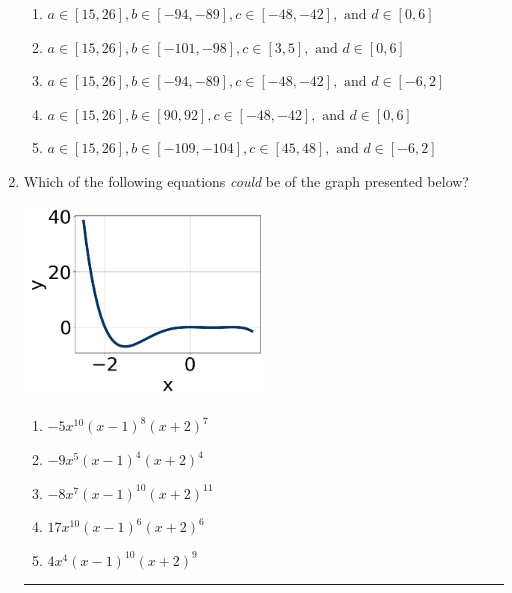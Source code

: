 \documentclass[14pt]{extbook}
\newcommand{\litem}[1]{\item#1\hspace*{-1cm}\rule{\textwidth}{0.4pt}}
\begin{document}
\begin{enumerate}
{\begin{enumerate}[label=\Alph*.]
\item \( a \in [15, 26], b \in [-94, -89], c \in [-48, -42], \text{ and } d \in [0, 6] \)
\item \( a \in [15, 26], b \in [-101, -98], c \in [3, 5], \text{ and } d \in [0, 6] \)
\item \( a \in [15, 26], b \in [-94, -89], c \in [-48, -42], \text{ and } d \in [-6, 2] \)
\item \( a \in [15, 26], b \in [90, 92], c \in [-48, -42], \text{ and } d \in [0, 6] \)
\item \( a \in [15, 26], b \in [-109, -104], c \in [45, 48], \text{ and } d \in [-6, 2] \)

\end{enumerate} }
\litem{
Which of the following equations \textit{could} be of the graph presented below?
\begin{center}
    \includegraphics[width=0.5\textwidth]{../Figures/polyGraphToFunctionA.png}
\end{center}
\begin{enumerate}[label=\Alph*.]
\item \( -5x^{10} (x - 1)^{8} (x + 2)^{7} \)
\item \( -9x^{5} (x - 1)^{4} (x + 2)^{4} \)
\item \( -8x^{7} (x - 1)^{10} (x + 2)^{11} \)
\item \( 17x^{10} (x - 1)^{6} (x + 2)^{6} \)
\item \( 4x^{4} (x - 1)^{10} (x + 2)^{9} \)

\end{enumerate} }
\end{enumerate}
\end{document}
